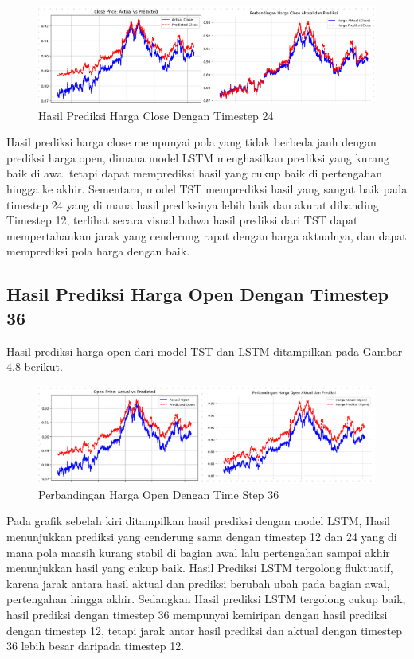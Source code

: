 \begin{figure} [H] \centering
    \includegraphics[scale=1.1]{gambar/perbandingan close(24).png} 
    \caption{Hasil Prediksi Harga Close Dengan Timestep 24}
    \label{fig:label_gambar}
\end{figure}
Hasil prediksi harga close mempunyai pola yang tidak berbeda jauh dengan prediksi harga open, dimana model LSTM menghasilkan prediksi yang kurang baik di awal tetapi dapat memprediksi hasil yang cukup baik di pertengahan hingga ke akhir. Sementara, model TST memprediksi hasil yang sangat baik pada timestep 24 yang di mana hasil prediksinya lebih baik dan akurat dibanding Timestep 12, terlihat secara visual bahwa hasil prediksi dari TST dapat mempertahankan jarak yang cenderung rapat dengan harga aktualnya, dan dapat memprediksi pola harga dengan baik. 

\subsection{Hasil Prediksi Harga Open Dengan Timestep 36}
Hasil prediksi harga open dari model TST dan LSTM ditampilkan pada Gambar 4.8 berikut.
\begin{figure} [H] \centering
    \includegraphics[scale=1.2]{gambar/perbandingan open(36).png} 
    \caption{Perbandingan Harga Open Dengan Time Step 36}
    \label{fig:label_gambar}
\end{figure}
Pada grafik sebelah kiri ditampilkan hasil prediksi dengan model LSTM, Hasil menunjukkan prediksi yang cenderung sama dengan timestep 12 dan 24 yang di mana pola maasih kurang stabil di bagian awal lalu pertengahan sampai akhir menunjukkan hasil yang cukup baik. Hasil Prediksi LSTM tergolong fluktuatif, karena jarak antara hasil aktual dan prediksi berubah ubah pada bagian awal, pertengahan hingga akhir. Sedangkan Hasil prediksi LSTM tergolong cukup baik, hasil prediksi dengan timestep 36 mempunyai kemiripan dengan hasil prediksi dengan timestep 12, tetapi jarak antar hasil prediksi dan aktual dengan timestep 36 lebih besar daripada timestep 12.


